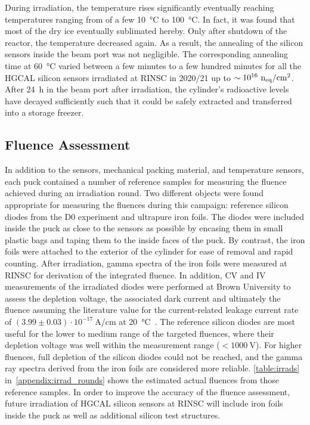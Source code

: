 During irradiation, the temperature rises significantly eventually reaching temperatures ranging from of a few \SI{10}{\celsius} to \SI{100}{\celsius}.
In fact, it was found that most of the dry ice eventually sublimated hereby.
Only after shutdown of the reactor, the temperature decreased again.
As a result, the annealing of the silicon sensors inside the beam port was not negligible.
The corresponding annealing time at \SI{60}{\celsius} varied between a few minutes to a few hundred minutes for all the HGCAL silicon sensors irradiated at RINSC in 2020/21 up to $\sim 10^{16}~\mathrm{n_{eq}}/\mathrm{cm}^{2}$.
After \SI{24}{\hour} in the beam port after irradiation, the cylinder's radioactive levels have decayed sufficiently such that it could be safely extracted and transferred into a storage freezer.

\subsection{Fluence Assessment}
In addition to the sensors, mechanical packing material, and temperature sensors, each puck contained a number of reference samples for measuring the fluence achieved during an irradiation round. 
Two different objects were found appropriate for measuring the fluences during this campaign: reference silicon diodes from the D0 experiment and ultrapure iron foils. 
The diodes were included inside the puck as close to the sensors as possible by encasing them in small plastic bags and taping them to the inside faces of the puck. 
By contrast, the iron foils were attached to the exterior of the cylinder for ease of removal and rapid counting. 
After irradiation, gamma spectra of the iron foils were measured at RINSC for derivation of the integrated fluence.
In addition, CV and IV measurements of the irradiated diodes were performed at Brown University to assess the depletion voltage, the associated dark current and ultimately the fluence assuming the literature value for the current-related leakage current rate of $\left(3.99\pm 0.03\right)\cdot 10^{-17}~$A/cm at \SI{20}{\celsius}~\cite{moll:SiDamages}.
The reference silicon diodes are most useful for the lower to medium range of the targeted fluences,  where their depletion voltage was well within the measurement range ($<\SI{1000}{\volt}$).
For higher fluences, full depletion of the silicon diodes could not be reached, and the gamma ray spectra derived from the iron foils are considered more reliable.
\ref{table:irrads} in~\ref{appendix:irrad_rounds} shows the estimated actual fluences from those reference samples.
In order to improve the accuracy of the fluence assessment, future irradiation of HGCAL silicon sensors at RINSC will include iron foils inside the puck as well as additional silicon test structures.